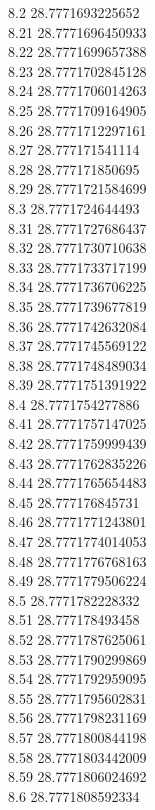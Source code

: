 {8.2	28.7771693225652\\
8.21	28.7771696450933\\
8.22	28.7771699657388\\
8.23	28.7771702845128\\
8.24	28.7771706014263\\
8.25	28.7771709164905\\
8.26	28.7771712297161\\
8.27	28.777171541114\\
8.28	28.777171850695\\
8.29	28.7771721584699\\
8.3	28.7771724644493\\
8.31	28.7771727686437\\
8.32	28.7771730710638\\
8.33	28.7771733717199\\
8.34	28.7771736706225\\
8.35	28.7771739677819\\
8.36	28.7771742632084\\
8.37	28.7771745569122\\
8.38	28.7771748489034\\
8.39	28.7771751391922\\
8.4	28.7771754277886\\
8.41	28.7771757147025\\
8.42	28.7771759999439\\
8.43	28.7771762835226\\
8.44	28.7771765654483\\
8.45	28.777176845731\\
8.46	28.7771771243801\\
8.47	28.7771774014053\\
8.48	28.7771776768163\\
8.49	28.7771779506224\\
8.5	28.7771782228332\\
8.51	28.777178493458\\
8.52	28.7771787625061\\
8.53	28.7771790299869\\
8.54	28.7771792959095\\
8.55	28.7771795602831\\
8.56	28.7771798231169\\
8.57	28.7771800844198\\
8.58	28.7771803442009\\
8.59	28.7771806024692\\
8.6	28.7771808592334\\
}
